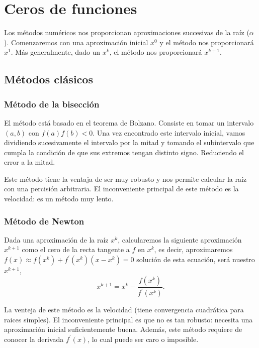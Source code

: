 \chapter{Ceros de funciones}

Los métodos numéricos nos proporcionan aproximaciones succesivas de la raíz ($\alpha$).
Comenzaremos con una aproximación inicial $x^0$  y el método nos proporcionará $x^1$. Más
generalmente, dado un $x^k$, el método nos proporcionará $x^{k+1}$.

\section{Métodos clásicos}

\subsection{Método de la bisección}

El método está basado en el teorema de Bolzano. Consiste en tomar un intervalo $(a, b)$
con $f(a)f(b) < 0$. Una vez encontrado este intervalo inicial, vamos dividiendo sucesivamente
el intervalo por la mitad y tomando el subintervalo que cumpla la condición de que sus extremos tengan
distinto signo. Reduciendo el error a la mitad.

Este método tiene la ventaja de ser muy robusto y nos permite calcular la raíz con una percisión arbitraria.
El inconveniente principal de este método es la velocidad: es un método muy lento.

\subsection{Método de Newton}

Dada una aproximación de la raíz $x^k$, calcularemos la siguiente aproximación $x^{k+1}$ como el cero de 
la recta tangente a $f$ en $x^k$, es decir, aproximaremos $f(x) \approx
f\left( x^k \right) + f^\prime\left( x^k \right) \left( x - x^k \right) = 0$  solución de esta ecuación,
será nuestro $x^{k+1}$,
\[
    x^{k+1} = x^k - \frac{f\left( x^k \right)}{f^\prime\left( x^k \right)}.
\]

La venteja de este método es la velocidad (tiene convergencia cuadrática para raices simples).
El inconveniente principal es que no es tan robusto: necesita una aproximación inicial suficientemente buena.
Además, este método requiere de conocer la derivada $f^\prime(x)$, lo cual puede ser caro o imposible.


